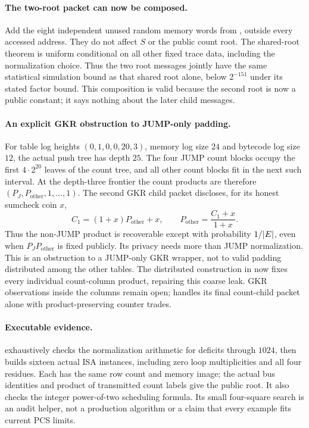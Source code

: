 \documentclass[11pt]{article}
\begin{document}
\paragraph{The two-root packet can now be composed.} Add the eight independent unused random memory words from , outside every accessed address. They do not affect $S$ or the public count root. The shared-root theorem is uniform conditional on all other fixed trace data, including the normalization choice. Thus the two root messages jointly have the same statistical simulation bound as that shared root alone, below $2^{-151}$ under its stated factor bound. This composition is valid because the second root is now a public constant; it says nothing about the later child messages.

\paragraph{An explicit GKR obstruction to JUMP-only padding.} For table log heights $(0,1,0,0,20,3)$, memory log size $24$ and bytecode log size $12$, the actual push tree has depth $25$. The four JUMP count blocks occupy the first $4\cdot2^{20}$ leaves of the count tree, and all other count blocks fit in the next such interval. At the depth-three frontier the count products are therefore $(P_J,P_{\mathrm{other}},1,\ldots,1)$. The second GKR child packet discloses, for its honest sumcheck coin $x$,
\[
 C_1=(1+x)P_{\mathrm{other}}+x,
 \qquad P_{\mathrm{other}}=\frac{C_1+x}{1+x}.
\]
Thus the non-JUMP product is recoverable except with probability $1/|E|$, even when $P_JP_{\mathrm{other}}$ is fixed publicly. Its privacy needs more than JUMP normalization. This is an obstruction to a JUMP-only GKR wrapper, not to valid padding distributed among the other tables. The distributed construction in  now fixes every individual count-column product, repairing this coarse leak. GKR observations inside the columns remain open;  handles its final count-child packet alone with product-preserving counter trades.

\paragraph{Executable evidence.}  exhaustively checks the normalization arithmetic for deficits through $1024$, then builds sixteen actual ISA instances, including zero loop multiplicities and all four residues. Each has the same row count and memory image; the actual bus identities and product of transmitted count labels give the public root. It also checks the integer power-of-two scheduling formula. Its small four-square search is an audit helper, not a production algorithm or a claim that every example fits current PCS limits.
\end{document}
